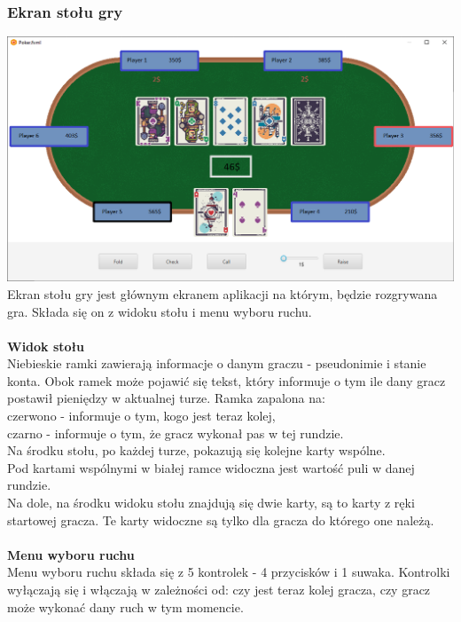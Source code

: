 \documentclass{article}
\begin{document}
        \subsubsection{Ekran stołu gry}
            \includegraphics[width=\textwidth]{gui_table.png}
            Ekran stołu gry jest głównym ekranem aplikacji na którym, będzie rozgrywana gra.
            Składa się on z widoku stołu i menu wyboru ruchu.\\
            \\
            \textbf{Widok stołu}\\
            Niebieskie ramki zawierają informacje o danym graczu - pseudonimie i stanie konta.
            Obok ramek może pojawić się tekst, który informuje o tym ile dany gracz postawił pieniędzy w aktualnej turze. Ramka zapalona na:\\
            czerwono - informuje o tym, kogo jest teraz kolej,\\
            czarno - informuje o tym, że gracz wykonał pas w tej rundzie.\\
            Na środku stołu, po każdej turze, pokazują się kolejne karty wspólne.\\
            Pod kartami wspólnymi w białej ramce widoczna jest wartość puli w danej rundzie.\\
            Na dole, na środku widoku stołu znajdują się dwie karty, są to karty z ręki startowej gracza. Te karty widoczne są tylko dla gracza do którego one należą.\\
            \\
            \textbf{Menu wyboru ruchu}\\
            Menu wyboru ruchu składa się z 5 kontrolek - 4 przycisków i 1 suwaka. Kontrolki wyłączają się i włączają w zależności od: czy jest teraz kolej gracza, czy gracz może wykonać dany ruch w tym momencie.\\
\end{document}
